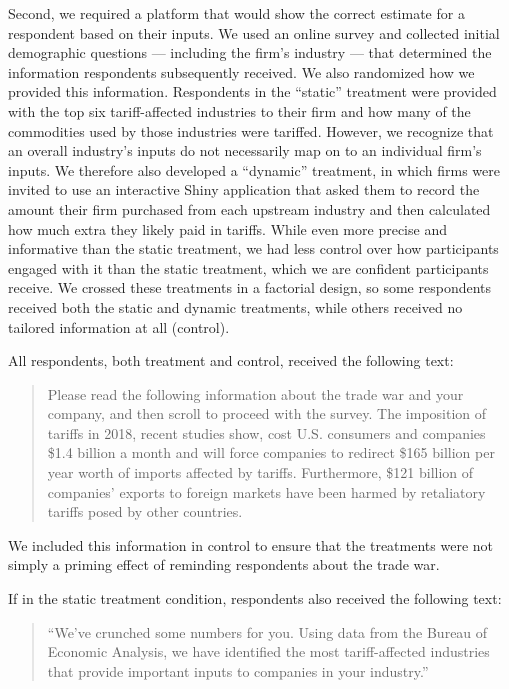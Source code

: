\documentclass{article}
\begin{document}
Second, we required a platform that would show the correct estimate for a respondent based on their inputs. We used an online survey and collected initial demographic questions --- including the firm's industry --- that determined the information respondents subsequently received. We also randomized how we provided this information. Respondents in the ``static'' treatment were provided with the top six tariff-affected industries to their firm and how many of the commodities used by those industries were tariffed. However, we recognize that an overall industry's inputs do not necessarily map on to an individual firm's inputs. We therefore also developed a ``dynamic'' treatment, in which firms were invited to use an interactive Shiny application that asked them to record the amount their firm purchased from each upstream industry and then calculated how much extra they likely paid in tariffs. While even more precise and informative than the static treatment, we had less control over how participants engaged with it than the static treatment, which we are confident participants receive. We crossed these treatments in a factorial design, so some respondents received both the static and dynamic treatments, while others received no tailored information at all (control).

All respondents, both treatment and control, received the following text:

\begin{quotation}
Please read the following information about the trade war and your company, and then scroll to proceed with the survey. The imposition of tariffs in 2018, recent studies show, cost U.S. consumers and companies \$1.4 billion a month and will force companies to redirect \$165 billion per year worth of imports affected by tariffs. Furthermore, \$121 billion of companies' exports to foreign markets have been harmed by retaliatory tariffs posed by other countries.
\end{quotation}

We included this information in control to ensure that the treatments were not simply a priming effect of reminding respondents about the trade war.

If in the static treatment condition, respondents also received the following text:

\begin{quotation}
``We've crunched some numbers for you. Using data from the Bureau of Economic Analysis, we have identified the most tariff-affected industries that provide important inputs to companies in your industry.''
\end{quotation} 
\end{document}
